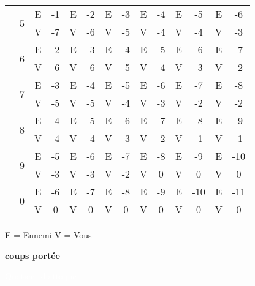 \documentclass[10pt]{book}
\begin{document}
\begin{minipage}[t]{\textwidth}
\begin{flushright}
{\begin{tabular}{c|c|c c|c c|c c|c c|c c|c c|}
        & \multirow{2}{*}{5}& E&  -1& E&  -2& E&  -3& E&  -4& E&  -5& E&  -6\\
        \cline{3-14}
        & & V&  -7& V&  -6& V&  -5& V&  -4& V&  -4& V&  -3\\
        \cline{2-14}

        & \multirow{2}{*}{6}& E&  -2& E&  -3& E&  -4& E&  -5& E&  -6& E&  -7\\
        \cline{3-14}
        & & V&  -6& V&  -6& V&  -5& V&  -4& V&  -3& V&  -2\\
        \cline{2-14}

        & \multirow{2}{*}{7}& E&  -3& E&  -4& E&  -5& E&  -6& E&  -7& E&  -8\\
        \cline{3-14}
        & & V&  -5& V&  -5& V&  -4& V&  -3& V&  -2& V&  -2\\
        \cline{2-14}

        & \multirow{2}{*}{8}& E&  -4& E&  -5& E&  -6& E&  -7& E&  -8& E&  -9\\
        \cline{3-14}
        & & V&  -4& V&  -4& V&  -3& V&  -2& V&  -1& V&  -1\\
        \cline{2-14}

        & \multirow{2}{*}{9}& E&  -5& E&  -6& E&  -7& E&  -8& E&  -9& E& -10\\
        \cline{3-14}
        & & V&  -3& V&  -3& V&  -2& V& 0& V& 0& V& 0\\
        \cline{2-14}

        & \multirow{2}{*}{0}& E&  -6& E&  -7& E&  -8& E&  -9& E& -10& E& -11\\
        \cline{3-14}
        & & V& 0& V& 0& V& 0& V& 0& V& 0& V& 0\\
        \cline{2-14}
    \end{tabular}}
  \end{flushright}
\end{minipage}

\begin{center}
    E = Ennemi \quad\quad V = Vous
\end{center}

\newpage

\begin{flushleft}
    \textbf{\Large coups portée}\\
\end{flushleft}

\textcolor{white}{Quotient d'attaque}\\
\end{document}
